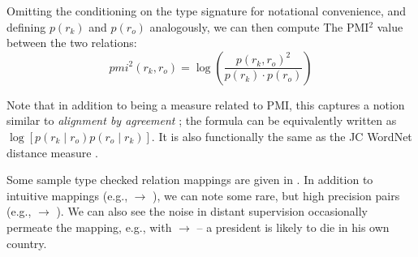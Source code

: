 Omitting the conditioning on the type signature for notational convenience,
  and defining $p(r_k)$ and $p(r_o)$ analogously,
  we can then compute The PMI$^2$ value between the two relations:
\begin{equation*}
  pmi^2(r_k, r_o) = \log \left( \frac{p(r_k, r_o)^2}{p(r_k) \cdot p(r_o)} \right)
\end{equation*}

Note that in addition to being a measure related to PMI, this captures
  a notion similar to \textit{alignment by agreement} 
  \cite{key:2006liang-alignment};
  the formula can be equivalently written as 
  $\log \left[ p(r_k \mid r_o) p(r_o \mid r_k)\right]$.
It is also functionally the same as the JC WordNet distance measure
  \cite{key:1997jc-similarity}.

Some sample type checked relation mappings are given in .
In addition to intuitive mappings (e.g.,  $\rightarrow$ 
  ), we can note some rare, but high precision pairs
  (e.g.,  $\rightarrow$ ).
We can also see the noise in distant supervision occasionally permeate 
  the mapping, e.g., with  $\rightarrow$ 
  -- a president is likely to die in his own country.


  



